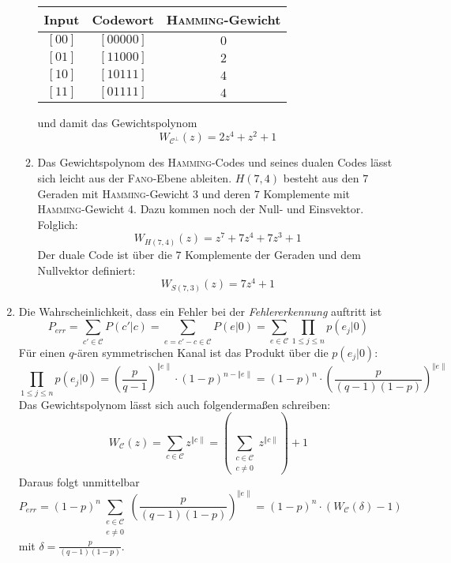 \begin{enumerate}
\begin{enumerate}
		\begin{center}
		\begin{tabular}{c|c|c}
		Input & Codewort & \textsc{Hamming}-Gewicht \\
		\hline
		$[0 0]$ & $[0 0 0 0 0]$ & $0$ \\
		$[0 1]$ & $[1 1 0 0 0]$ & $2$ \\
		$[1 0]$ & $[1 0 1 1 1]$ & $4$ \\
		$[1 1]$ & $[0 1 1 1 1]$ & $4$
		\end{tabular}
		\end{center}

		und damit das Gewichtspolynom
		\[ W_{\mathcal{C}^{\bot}}(z) = 2z^4 + z^2 + 1 \]
		\item
		Das Gewichtspolynom des \textsc{Hamming}-Codes und seines
		dualen Codes lässt sich leicht aus der \textsc{Fano}-Ebene
		ableiten.
		$H(7,4)$ besteht aus den $7$ Geraden mit
		\textsc{Hamming}-Gewicht $3$ und deren $7$ Komplemente	mit
		\textsc{Hamming}-Gewicht $4$. Dazu kommen noch der Null- und
		Einsvektor. Folglich:
		\[ W_{H(7,4)}(z) = z^7 + 7z^4 + 7z^3 + 1 \]
		Der duale Code ist über die $7$ Komplemente der Geraden und dem
		Nullvektor definiert:
		\[ W_{S(7,3)}(z) = 7z^4 + 1 \]
		\end{enumerate}
	\item
		Die Wahrscheinlichkeit, dass ein Fehler bei der
		\textit{Fehlererkennung} auftritt ist
		\[ P_{err} = \sum_{c'\in\mathcal{C}} P(c'|c) =
		\sum_{e=c'-c\in\mathcal{C}} P(e|0) = \sum_{e\in\mathcal{C}}
		\prod_{1\leq j\leq n} p(e_j|0) \]
		Für einen $q$-ären symmetrischen Kanal ist das Produkt über die
		$p(e_j|0)$:
		\[ \prod_{1\leq j\leq n} p(e_j|0) = \left(\frac{p}{q-1}\right)^{\left
		\Vert e\right \|}\cdot(1-p)^{n-\left \Vert e \right \|} =
		(1-p)^n\cdot\left(\frac{p}{(q-1)(1-p)}\right)^{\left \Vert e
		\right \|} \]
		Das Gewichtspolynom lässt sich auch folgendermaßen schreiben:
		\[ W_{\mathcal{C}}(z) = \sum_{c\in\mathcal{C}} z^{\left \Vert c
		\right \|} = \left(\sum_{\substack{c\in\mathcal{C}\\c\not=0}}
		z^{\left \Vert c \right \|}\right) + 1 \]
		Daraus folgt unmittelbar
		\[ P_{err} =
		(1-p)^n\sum_{\substack{e\in\mathcal{C}\\e\not=0}}\left(\frac{p}{(q-1)(1-p)}\right)^{\left
		\Vert e \right \|} = (1-p)^n\cdot(W_\mathcal{C}(\delta)-1) \]
		mit $\delta = \frac{p}{(q-1)(1-p)}$.
\end{enumerate}
